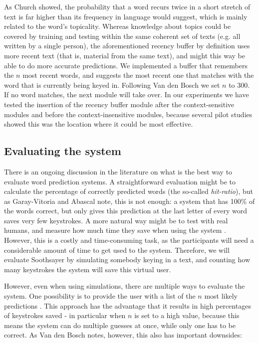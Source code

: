 \documentclass[12pt]{article}
\begin{document}
As Church \citeyear{church02} showed, the probability that a word recurs twice in a short stretch of text is far higher than its  frequency in language would suggest, which is mainly related to the word's topicality. Whereas knowledge about topics could be covered by training and testing within the same coherent set of texts (e.g. all written by a single person), the aforementioned recency buffer by definition uses more recent text (that is, material from the same text), and might this way be able to do more accurate predictions. We implemented a buffer that remembers the $n$ most recent words, and suggests the most recent one that matches with the word that is currently being keyed in. Following Van den Bosch \citeyear{vandenbosch11} we set $n$ to 300. If no word matches, the next module will take over. In our experiments we have tested the insertion of the recency buffer module after the context-sensitive modules and before the context-insensitive modules, because several pilot studies showed this was the location where it could be most effective.

\subsection{Evaluating the system} \label{evaluation}

There is an ongoing discussion in the literature on what is the best way to evaluate word prediction systems. A straightforward evaluation might be to calculate the percentage of correctly predicted words (the so-called \emph{hit-ratio}), but as Garay-Vitoria and Abascal \citeyear{Garay-Vitoria+06} note, this is not enough: a system that has 100\% of the words correct, but only gives this prediction at the last letter of every word saves very few keystrokes. A more natural way might be to test with real humans, and measure how much time they save when using the system \cite{carlberger+97,koester+98,Garay-Vitoria+06}. However, this is a costly and time-consuming task, as the participants will need a considerable amount of time to get used to the system. Therefore, we will evaluate Soothsayer by simulating somebody keying in a text, and counting how many keystrokes the system will save this virtual user. 

However, even when using simulations, there are multiple ways to evaluate the system. One possibility is to provide the user with a list of the $n$ most likely predictions \cite{Lesher+99,Fazly+03}. This approach has the advantage that it results in high percentages of keystrokes saved - in particular when $n$ is set to a high value, because this means the system can do multiple guesses at once, while only one has to be correct. As Van den Bosch \citeyear{vandenbosch11} notes, however, this also has important downsides: 
\end{document}

